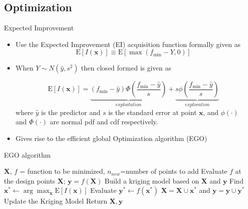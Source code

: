 \documentclass{beamer}
\newcommand{\X}{\boldsymbol{X}}
\newcommand{\x}{\boldsymbol{x}}
\newcommand{\y}{\boldsymbol{y}}
\begin{document}





\subsection{Optimization}
\begin{frame}{Expected Improvement}
\begin{itemize}%
    \item Use the Expected Improvement (EI) acquisition function formally given as
    $$
    \mathrm{E}[I(\mathbf{x})] \equiv \mathrm{E}\left[\max \left(f_{\min }-Y, 0\right)\right]
    $$
    \item When $Y\sim N(\hat y, s^2)$ then closed formed is given as

    $$
    \mathrm{E}[I(\mathbf{x})]=\underbrace{\left(f_{\min }-\hat{y}\right) \Phi\left(\frac{f_{\min }-\hat{y}}{s}\right)}_{exploitation} + \underbrace{s \phi\left(\frac{f_{\min }-\hat{y}}{s}\right)}_{exploration}
    $$
    where $\hat y$ is the predictor and $s$ is the standard error at point $\mathbf{x}$, and $\phi(\cdot)$ and $\Phi(\cdot)$ are normal pdf and cdf respectively.
    \parencite{jones1998efficient}

    \item Gives rise to the efficient global Optimization algorithm (EGO)
\end{itemize}
\end{frame}


 \begin{frame}
   \begin{algorithm}[H]
       \caption{EGO algorithm}
       \label{alg:ego2}
       \begin{algorithmic}[1]
           \Require $\X$, $f$ = function to be minimized, $n_{new}$=number of points to add
           \State Evaluate $f$ at the design points $\X$; $\y=f(\X)$
           \State Build a kriging model based on $\X$ and $\y$
            \State Find $\x^* \gets \arg\max_{\x}\mathrm{E}[I(\x)]$
            \State Evaluate $\y^* \gets f(\x^*)$
            \State $\X = \X \cup \x^*$ and $\y = \y \cup \y^*$
            \State Update the Kriging Model
           \EndFor
           \State Return $\X, \y$
       \end{algorithmic}
   \end{algorithm}
 \end{frame}
\end{document}
